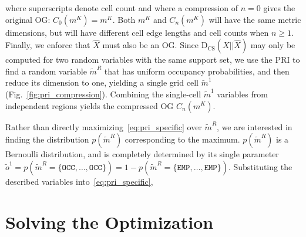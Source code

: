 where superscripts denote cell count and where a compression of $n=0$ gives the original OG:
$C_{0}(m^{K}) = m^{K}$. Both $m^{K}$ and $C_{n}(m^{K})$ will have the same metric dimensions,
but will have different cell edge lengths and cell counts when $n \ge 1$. Finally, we enforce
that $\hat{X}$ must also be an OG. Since $\text{D}_{\text{CS}}(X\vert \vert \hat{X})$ may only
be computed for two random variables with the same support set, we use the PRI to find a random
variable $\tilde{m}^{R}$ that has uniform occupancy probabilities, and then reduce its dimension
to one, yielding a single grid cell $\tilde{m}^{1}$ (Fig.~\ref{fig:pri_compression}). Combining the
single-cell $\tilde{m}^{1}$ variables from independent regions yields the compressed OG $C_{n}(m^{K})$.

Rather than directly maximizing~\eqref{eq:pri_specific} over $\tilde{m}^{R}$, we are interested in
finding the distribution $p(\tilde{m}^{R})$ corresponding to the maximum. $p(\tilde{m}^{R})$ is a
Bernoulli distribution, and is completely determined by its single parameter
$\tilde{o}^{1} = p(\tilde{m}^{R} = \{\texttt{OCC},\dots,\texttt{OCC}\}) = 1 -
p(\tilde{m}^{R} = \{\texttt{EMP},\dots,\texttt{EMP}\})$. Substituting the described
variables into~\eqref{eq:pri_specific},
%

\section{Solving the Optimization}

